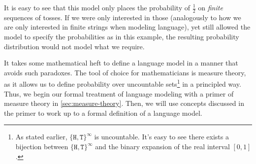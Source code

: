 \begin{example}
It is easy to see that this model only places the probability of $\frac{1}{2}$ on \emph{finite} sequences of tosses.
If we were only interested in those (analogously to how we are only interested in finite strings when modeling language), yet still allowed the model to specify the probabilities as in this example, the resulting probability distribution would not model what we require.
\end{example}

It takes some mathematical heft to define a language model in a manner that avoids such paradoxes. 
The tool of choice for mathematicians is measure theory, as it allows us to define
probability over uncountable sets\footnote{As stated earlier, $\{\texttt{H},\texttt{T}\}^\infty$ is uncountable. It's easy to see there exists a bijection between $\{\texttt{H},\texttt{T}\}^\infty$ and the binary expansion of the real interval $[0, 1]$.} in a principled way.
Thus, we begin our formal treatment of language modeling with a primer of measure theory in \cref{sec:measure-theory}.
Then, we will use concepts discussed in the primer to work up to a formal definition of a language model.

